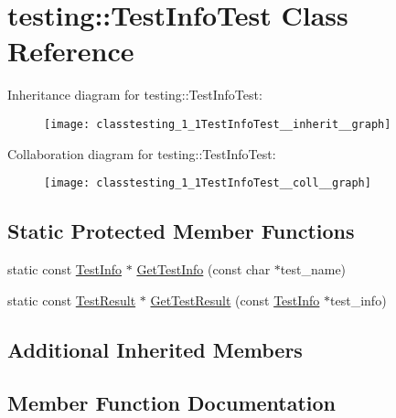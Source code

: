 \hypertarget{classtesting_1_1TestInfoTest}{}\section{testing\+:\+:Test\+Info\+Test Class Reference}
\label{classtesting_1_1TestInfoTest}


Inheritance diagram for testing\+:\+:Test\+Info\+Test\+:\nopagebreak
\begin{figure}[H]
\begin{center}
\leavevmode
\texttt{[image: classtesting\_1\_1TestInfoTest\_\_inherit\_\_graph]}
\end{center}
\end{figure}


Collaboration diagram for testing\+:\+:Test\+Info\+Test\+:\nopagebreak
\begin{figure}[H]
\begin{center}
\leavevmode
\texttt{[image: classtesting\_1\_1TestInfoTest\_\_coll\_\_graph]}
\end{center}
\end{figure}
\subsection*{Static Protected Member Functions}
\begin{DoxyCompactItemize}
\item 
static const \hyperlink{classtesting_1_1TestInfo}{Test\+Info} $\ast$ \hyperlink{classtesting_1_1TestInfoTest_a4140c1302bf53c7f1375a23923624f04}{Get\+Test\+Info} (const char $\ast$test\+\_\+name)
\item 
static const \hyperlink{classtesting_1_1TestResult}{Test\+Result} $\ast$ \hyperlink{classtesting_1_1TestInfoTest_a154b3679b1aa00ad037ce46eb60d18c3}{Get\+Test\+Result} (const \hyperlink{classtesting_1_1TestInfo}{Test\+Info} $\ast$test\+\_\+info)
\end{DoxyCompactItemize}
\subsection*{Additional Inherited Members}


\subsection{Member Function Documentation}
